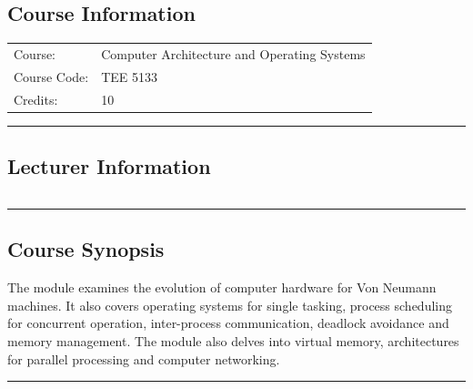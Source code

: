 
\subsection*{Course Information}
\vspace{0ex}%
\noindent\parbox{0.5\textwidth}{%
    \noindent\begin{tabular}{@{}ll}
                 \textsf{Course:}          & 	Computer Architecture and Operating Systems  \\
                 \textsf{Course Code:}         & 	TEE 5133   \\
                 \textsf{Credits:}    & 	10
    \end{tabular}}
\vspace{2ex}\hrule\vspace{2ex}

\subsection*{Lecturer Information}
\noindent\parbox{0.5\textwidth}{%
    \noindent\begin{tabular}{@{}ll}
                 
    \end{tabular}}
\vspace{2ex}\hrule\vspace{2ex}

\subsection*{Course Synopsis}
The module examines the evolution of computer hardware for Von Neumann machines.
It also covers operating systems for single tasking, process scheduling for concurrent operation, inter-process communication, deadlock avoidance and memory management.
The module also delves into virtual memory, architectures for parallel processing and computer networking.
\vspace{2ex} \hrule\vspace{2ex}

